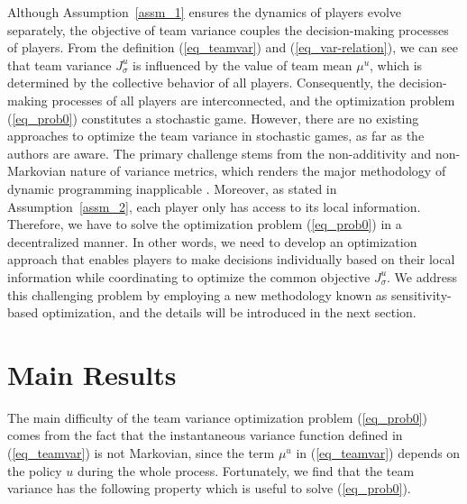 \documentclass[12pt]{article}
\begin{document}
Although Assumption~\ref{assm_1} ensures the dynamics of players
evolve separately, the objective of team variance couples the
decision-making processes of players. From the definition
(\ref{eq_teamvar}) and (\ref{eq_var-relation}), we can see that team
variance $J^u_{\sigma}$ is influenced by the value of team mean
$\mu^u$, which is determined by the collective behavior of all
players. Consequently, the decision-making processes of all players
are interconnected, and the optimization problem (\ref{eq_prob0})
constitutes a stochastic game. However, there are no existing
approaches to optimize the team variance in stochastic games, as far
as the authors are aware. The primary challenge stems from the
non-additivity and non-Markovian nature of variance metrics, which
renders the major methodology of dynamic programming inapplicable
\citep{Sobel82,Xia20}. Moreover, as stated in
Assumption~\ref{assm_2}, each player only has access to its local
information. Therefore, we have to solve the optimization problem
(\ref{eq_prob0}) in a decentralized manner. In other words, we need
to develop an optimization approach that enables players to make
decisions individually based on their local information while
coordinating to optimize the common objective $J^{u}_{\sigma}$. We
address this challenging problem by employing a new methodology
known as sensitivity-based optimization, and the details will be
introduced in the next section.




\section{Main Results}\label{section_result}
The main difficulty of the team variance optimization problem
(\ref{eq_prob0}) comes from the fact that the instantaneous variance
function defined in (\ref{eq_teamvar}) is not Markovian, since the
term $\mu^u$ in (\ref{eq_teamvar}) depends on the policy $u$ during
the whole process. Fortunately, we find that the team variance has
the following property which is useful to solve (\ref{eq_prob0}).
\end{document}
